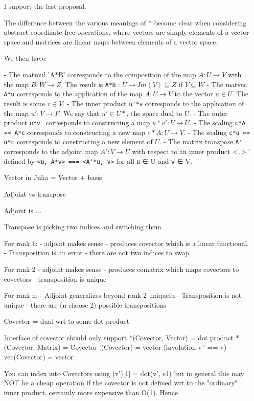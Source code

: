 I support the last proposal.

The difference between the various meanings of $*$ become clear when considering abstract coordinate-free operations, where vectors are simply elements of a vector space and matrices are linear maps between elements of a vector space.

We then have:

- The matmul 'A*B' corresponds to the composition of the map $A : U \rightarrow V$ with the map $B : W \rightarrow Z$. The result is
  \verb`A*B` : $U \rightarrow Im(V) \subseteq Z$ if $V \subseteq W$
- The matvec \verb`A*u` corresponds to the application of the map $A : U \rightarrow V$ to the vector $u \in U$. The result is some $v \in V$.
- The inner product \verb`u'*v` corresponds to the application of the map $u' : V \rightarrow F$. We say that $u' \in U*$, the space dual to $U$.
- The outer product \verb`u*v'` corresponds to constructing a map $u*v' : V \rightarrow U$.
- The scaling \verb`c*A == A*c` corresponds to constructing a new map $c*A : U \rightarrow V$.
- The scaling \verb`c*u == u*c` corresponds to constructing a new element of $U$.
- The matrix transpose \verb`A'` corresponds to the adjoint map $A' : V \rightarrow U$ with respect to an inner product $< , >`$defined by
  \verb`<u, A*v> === <A'*u, v>` for all \verb`u` ∈ U and \verb`v` ∈ V.



Vector in Julia = Vector  + basis

Adjoint vs transpose

Adjoint is ...

Transpose is picking two indices and switching them.

For rank 1:
- adjoint makes sense - produces covector which is a linear functional.
- Transposition is an error - there are not two indices to swap.

For rank 2
- adjoint makes sense - produces comatrix which maps covectors to covectors
- transposition is unique

For rank n:
- Adjoint generalizes beyond rank 2 uniquelu
- Transposition is not unique - there are (n choose 2) possible transpositions

Covector = dual wrt to some dot product

Interface of covector
should only support
*(Covector, Vector) = dot product
*(Covector, Matrix) = Covector
'(Covector) = vector (involution v'' == v)
vec(Covector) = vector

You can index into Covectors using (v')[1] = dot(v', e1) but in general this may NOT be a cheap operation if the covector is not defined wrt to the "ordinary" inner product, certainly more expensive than O(1). Hence


